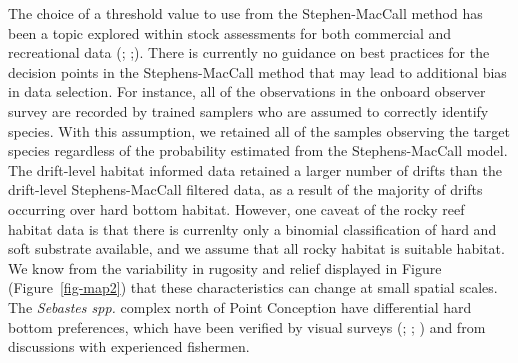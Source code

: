 \documentclass[
  12pt,
  authoryear,
  preprint,
  3p]{elsarticle}
\begin{document}
The choice of a threshold value to use from the Stephen-MacCall method
has been a topic explored within stock assessments for both commercial
and recreational data (\citet{Dettloff:2021:ISA};
\citet{Cope:2015:DMS};\citet{DucharmeBarth:2018:IAG}). There is
currently no guidance on best practices for the decision points in the
Stephens-MacCall method that may lead to additional bias in data
selection. For instance, all of the observations in the onboard observer
survey are recorded by trained samplers who are assumed to correctly
identify species. With this assumption, we retained all of the samples
observing the target species regardless of the probability estimated
from the Stephens-MacCall model. The drift-level habitat informed data
retained a larger number of drifts than the drift-level Stephens-MacCall
filtered data, as a result of the majority of drifts occurring over hard
bottom habitat. However, one caveat of the rocky reef habitat data is
that there is currenlty only a binomial classification of hard and soft
substrate available, and we assume that all rocky habitat is suitable
habitat. We know from the variability in rugosity and relief displayed
in Figure (Figure~\ref{fig-map2}) that these characteristics can change
at small spatial scales. The \emph{Sebastes spp.} complex north of Point
Conception have differential hard bottom preferences, which have been
verified by visual surveys (\citet{Laidig:2009:DFH};
\citet{Anderson:2007:MHA}; \citet{Haggarty:2006:CIR} ) and from
discussions with experienced fishermen.
\end{document}
